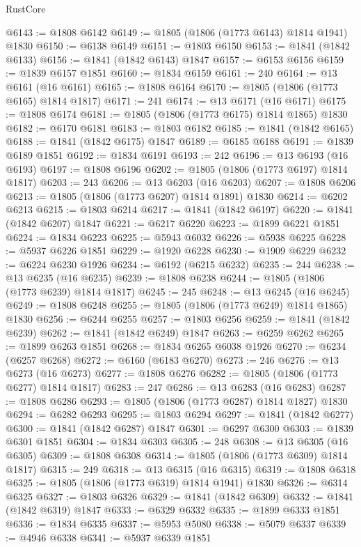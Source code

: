\begin{lexlean}{RustCore}
\begin{coremodule}
@6143 := @1808 @6142
@6149 := @1805 (@1806 (@1773 @6143) @1814 @1941) @1830
@6150 := @6138 @6149
@6151 := @1803 @6150
@6153 := @1841 (@1842 @6133)
@6156 := @1841 (@1842 @6143) @1847
@6157 := @6153 @6156
@6159 := @1839 @6157 @1851
@6160 := @1834 @6159
@6161 := 240
@6164 := @13 @6161 (@16 @6161)
@6165 := @1808 @6164
@6170 := @1805 (@1806 (@1773 @6165) @1814 @1817)
@6171 := 241
@6174 := @13 @6171 (@16 @6171)
@6175 := @1808 @6174
@6181 := @1805 (@1806 (@1773 @6175) @1814 @1865) @1830
@6182 := @6170 @6181
@6183 := @1803 @6182
@6185 := @1841 (@1842 @6165)
@6188 := @1841 (@1842 @6175) @1847
@6189 := @6185 @6188
@6191 := @1839 @6189 @1851
@6192 := @1834 @6191
@6193 := 242
@6196 := @13 @6193 (@16 @6193)
@6197 := @1808 @6196
@6202 := @1805 (@1806 (@1773 @6197) @1814 @1817)
@6203 := 243
@6206 := @13 @6203 (@16 @6203)
@6207 := @1808 @6206
@6213 := @1805 (@1806 (@1773 @6207) @1814 @1891) @1830
@6214 := @6202 @6213
@6215 := @1803 @6214
@6217 := @1841 (@1842 @6197)
@6220 := @1841 (@1842 @6207) @1847
@6221 := @6217 @6220
@6223 := @1899 @6221 @1851
@6224 := @1834 @6223
@6225 := @5943 @6032
@6226 := @5938 @6225
@6228 := @5937 @6226 @1851
@6229 := @1920 @6228
@6230 := @1909 @6229
@6232 := @6224 @6230 @1926
@6234 := @6192 (@6215 @6232)
@6235 := 244
@6238 := @13 @6235 (@16 @6235)
@6239 := @1808 @6238
@6244 := @1805 (@1806 (@1773 @6239) @1814 @1817)
@6245 := 245
@6248 := @13 @6245 (@16 @6245)
@6249 := @1808 @6248
@6255 := @1805 (@1806 (@1773 @6249) @1814 @1865) @1830
@6256 := @6244 @6255
@6257 := @1803 @6256
@6259 := @1841 (@1842 @6239)
@6262 := @1841 (@1842 @6249) @1847
@6263 := @6259 @6262
@6265 := @1899 @6263 @1851
@6268 := @1834 @6265 @6038 @1926
@6270 := @6234 (@6257 @6268)
@6272 := @6160 (@6183 @6270)
@6273 := 246
@6276 := @13 @6273 (@16 @6273)
@6277 := @1808 @6276
@6282 := @1805 (@1806 (@1773 @6277) @1814 @1817)
@6283 := 247
@6286 := @13 @6283 (@16 @6283)
@6287 := @1808 @6286
@6293 := @1805 (@1806 (@1773 @6287) @1814 @1827) @1830
@6294 := @6282 @6293
@6295 := @1803 @6294
@6297 := @1841 (@1842 @6277)
@6300 := @1841 (@1842 @6287) @1847
@6301 := @6297 @6300
@6303 := @1839 @6301 @1851
@6304 := @1834 @6303
@6305 := 248
@6308 := @13 @6305 (@16 @6305)
@6309 := @1808 @6308
@6314 := @1805 (@1806 (@1773 @6309) @1814 @1817)
@6315 := 249
@6318 := @13 @6315 (@16 @6315)
@6319 := @1808 @6318
@6325 := @1805 (@1806 (@1773 @6319) @1814 @1941) @1830
@6326 := @6314 @6325
@6327 := @1803 @6326
@6329 := @1841 (@1842 @6309)
@6332 := @1841 (@1842 @6319) @1847
@6333 := @6329 @6332
@6335 := @1899 @6333 @1851
@6336 := @1834 @6335
@6337 := @5953 @5080
@6338 := @5079 @6337
@6339 := @4946 @6338
@6341 := @5937 @6339 @1851

\end{coremodule}
\end{lexlean}

